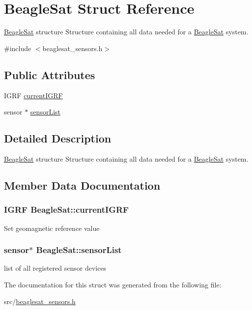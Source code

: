 \hypertarget{structBeagleSat}{}\section{Beagle\+Sat Struct Reference}
\label{structBeagleSat}


\hyperlink{structBeagleSat}{Beagle\+Sat} structure Structure containing all data needed for a \hyperlink{structBeagleSat}{Beagle\+Sat} system.  




{\ttfamily \#include $<$beaglesat\+\_\+sensors.\+h$>$}

\subsection*{Public Attributes}
\begin{DoxyCompactItemize}
\item 
I\+G\+R\+F \hyperlink{structBeagleSat_a530dcdddb63f41cad43759cc3fdd4df4}{current\+I\+G\+R\+F}
\item 
sensor $\ast$ \hyperlink{structBeagleSat_a6158749e56dd68cf1fce3e89f3824f30}{sensor\+List}
\end{DoxyCompactItemize}


\subsection{Detailed Description}
\hyperlink{structBeagleSat}{Beagle\+Sat} structure Structure containing all data needed for a \hyperlink{structBeagleSat}{Beagle\+Sat} system. 

\subsection{Member Data Documentation}
\hypertarget{structBeagleSat_a530dcdddb63f41cad43759cc3fdd4df4}{}
\subsubsection[{current\+I\+G\+R\+F}]{\setlength{\rightskip}{0pt plus 5cm}I\+G\+R\+F Beagle\+Sat\+::current\+I\+G\+R\+F}\label{structBeagleSat_a530dcdddb63f41cad43759cc3fdd4df4}
Set geomagnetic reference value \hypertarget{structBeagleSat_a6158749e56dd68cf1fce3e89f3824f30}{}
\subsubsection[{sensor\+List}]{\setlength{\rightskip}{0pt plus 5cm}sensor$\ast$ Beagle\+Sat\+::sensor\+List}\label{structBeagleSat_a6158749e56dd68cf1fce3e89f3824f30}
list of all registered sensor devices 

The documentation for this struct was generated from the following file\+:\begin{DoxyCompactItemize}
\item 
src/\hyperlink{beaglesat__sensors_8h}{beaglesat\+\_\+sensors.\+h}\end{DoxyCompactItemize}
